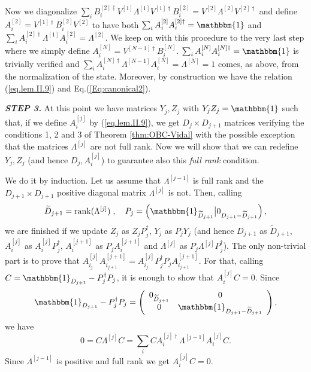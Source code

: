 \documentclass[aps,prl,epsfig,graphics,floatfix,mathbbm,a4paper]{article}
\newcommand{\1}{\mathbbm{1}}
\renewcommand{\>}{\rangle}
\newcommand{\<}{\langle}
\DeclareMathOperator{\rank}{rank}
\begin{document}
{    Now we diagonalize $\sum_i
        B^{[2]\dagger}_iV^{[1]}\Lambda^{[1]}V^{[1]\dagger}B^{[2]}_i=V^{[2]}\Lambda^{[2]}V^{[2]\dagger}$
    and define $A^{[2]}_i=V^{[1]\dagger}B^{[2]}_iV^{[2]}$ to have both
    $\sum_iA_i^{[2]}A_i^{[2]\dagger}=\mathbbm{1}$ and
    $\sum_iA_i^{[2]\dagger}\Lambda^{[1]}A_i^{[2]}=\Lambda^{[2]}$. We
    keep on with this procedure to the very last step where we simply
    define $A_i^{[N]}=V^{[N-1]\dagger}B^{[N]}_i$.
    $\sum_iA_i^{[N]}A_i^{[N]\dagger}=\mathbbm{1}$  is trivially
    verified and
    $\sum_iA_i^{[N]\dagger}\Lambda^{[N-1]}A_i^{[N]}=\Lambda^{[N]}=1$
    comes, as above, from the normalization of the state. Moreover, by
    construction we have the relation (\ref{eq.lem.II.9}) and
    Eq.(\ref{Eq:canonical2}).



    \textbf{\it{STEP 3.}} At this point we have matrices ${Y}_j,
        {Z}_j$ with ${Y}_jZ_j=\1$ such that, if we define ${A}_i^{[j]}$ by
    (\ref{eq.lem.II.9}), we get ${D}_j\times {D}_{j+1}$ matrices
    verifying the conditions 1, 2 and 3 of Theorem \ref{thm:OBC-Vidal}
    with the possible exception that the matrices $\Lambda^{[j]}$ are
    not full rank. Now we will show that we can redefine $Y_j, Z_j$
    (and hence $D_j, A_i^{[j]}$) to guarantee also this {\it full
            rank} condition.

    We do it by induction. Let us assume that $\Lambda^{[j-1]}$ is
    full rank and the $D_{j+1}\times D_{j+1}$ positive diagonal matrix
    $\Lambda^{[j]}$ is not. Then, calling
    $$\widetilde{D}_{j+1}=\rank(\Lambda^{[j]})\;, \quad
        P_j=\left(\1_{\widetilde{D}_{j+1}}\big|0_{D_{j+1}-\widetilde{D}_{j+1}}\right),$$
    we are finished if we update $Z_j$ as $Z_jP_j^{\dagger}$, $Y_j$ as
    $P_jY_j$ (and hence ${D}_{j+1}$ as $\tilde{D}_{j+1}$, $A_i^{[j]}$
    as $A_i^{[j]}P_j^{\dagger}$, $A_i^{[j+1]}$ as $P_jA_i^{[j+1]}$ and
    $\Lambda^{[j]}$ as $P_j\Lambda^{[j]}P_j^{\dagger}$). The only
    non-trivial part is to prove that
    $A^{[j]}_{i_j}A^{[j+1]}_{i_{j+1}}=A^{[j]}_{i_j}P_j^{\dagger}P_jA^{[j+1]}_{i_{j+1}}$.
    For that, calling $C=\1_{D_{j+1}}-P_j^{\dagger}P_j$, it is
    enough to show that $A^{[j]}_iC=0$. Since $$\1_{D_{j+1}}-P_j^{\dagger}P_j=\left(%
        \begin{array}{cc}
                0_{\widetilde{D}_{j+1}} & 0                                \\
                0                       & \1_{D_{j+1}-\widetilde{D}_{j+1}} \\
            \end{array}%
        \right), $$  we have
    $$0=C\Lambda^{[j]}C=\sum_iC
        A^{[j]\dagger}_i\Lambda^{[j-1]}A^{[j]}_i C.$$ Since
    $\Lambda^{[j-1]}$ is positive and full rank we get $A^{[j]}_iC=0$.
}
\end{document}
